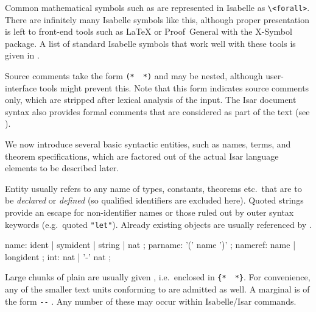 \begin{isabellebody}
\begin{isamarkuptext}
  Common mathematical symbols such as \isa{{\isasymforall}} are represented in
  Isabelle as \verb|\<forall>|.  There are infinitely many Isabelle
  symbols like this, although proper presentation is left to front-end
  tools such as {\LaTeX} or Proof~General with the X-Symbol package.
  A list of standard Isabelle symbols that work well with these tools
  is given in \cite[appendix~A]{isabelle-sys}.
  
  Source comments take the form \verb|(*|~\isa{{\isasymdots}}~\verb|*)| and may be nested, although user-interface
  tools might prevent this.  Note that this form indicates source
  comments only, which are stripped after lexical analysis of the
  input.  The Isar document syntax also provides formal comments that
  are considered as part of the text (see ).%
\end{isamarkuptext}%
\isamarkuptrue%
%
\isamarkuptrue%
%
\begin{isamarkuptext}%
We now introduce several basic syntactic entities, such as names,
  terms, and theorem specifications, which are factored out of the
  actual Isar language elements to be described later.%
\end{isamarkuptext}%
\isamarkuptrue%
%
\isamarkuptrue%
%
\begin{isamarkuptext}%
Entity  usually refers to any name of types,
  constants, theorems etc.\ that are to be \emph{declared} or
  \emph{defined} (so qualified identifiers are excluded here).  Quoted
  strings provide an escape for non-identifier names or those ruled
  out by outer syntax keywords (e.g.\ quoted \verb|"let"|).
  Already existing objects are usually referenced by
  .

  \begin{rail}
    name: ident | symident | string | nat
    ;
    parname: '(' name ')'
    ;
    nameref: name | longident
    ;
    int: nat | '-' nat
    ;
  \end{rail}%
\end{isamarkuptext}%
\isamarkuptrue%
%
\isamarkuptrue%
%
\begin{isamarkuptext}%
Large chunks of plain  are usually given
  , i.e.\ enclosed in \verb|{|\verb|*|~\isa{{\isasymdots}}~\verb|*|\verb|}|.  For convenience,
  any of the smaller text units conforming to  are
  admitted as well.  A marginal  is of the form
  \verb|--| .  Any number of these may occur
  within Isabelle/Isar commands.


\end{isamarkuptext}
\end{isabellebody}
